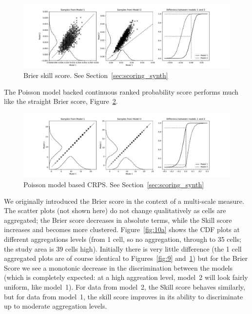 \documentclass[twoside,a4paper,twocolumn,10pt]{article}
\theoremstyle{plain}
\theoremstyle{definition}
\begin{document}
\begin{figure}
  \includegraphics[width=\textwidth]{../details/brier1.pdf}
  \caption{Brier skill score.  See Section~\ref{sec:scoring_synth}}
   \label{fig:9a}
\end{figure}

The Poisson model backed continuous ranked probability score performs much like the
straight Brier score, Figure~\ref{fig:10}.

\begin{figure}
  \includegraphics[width=\textwidth]{../details/po_brier.pdf}
  \caption{Poisson model based CRPS.  See Section~\ref{sec:scoring_synth}}
   \label{fig:10}
\end{figure}

We originally introduced the Brier score in the context of a multi-scale measure.
The scatter plots (not shown here) do not change qualitatively as cells are aggregated;
the Brier score decreases in absolute terms, while the Skill score increases and becomes
more clustered.  Figure~\ref{fig:10a} shows the CDF plots at different aggregations levels
(from 1 cell, so no aggregation, through to 35 cells; the study area is 39 cells high).
Initially there is very little difference (the 1 cell aggregated plots are of course
identical to Figures~\ref{fig:9} and~\ref{fig:9a}) but for the Brier Score we see a
monotonic decrease in the discrimination between the models (which is completely expected:
at a high aggreation level, model~2 will look fairly uniform, like model~1).  For data from
model~2, the Skill score behaves similarly, but for data from model~1, the skill score improves
in its ability to discriminate up to moderate aggregation levels.
\end{document}
